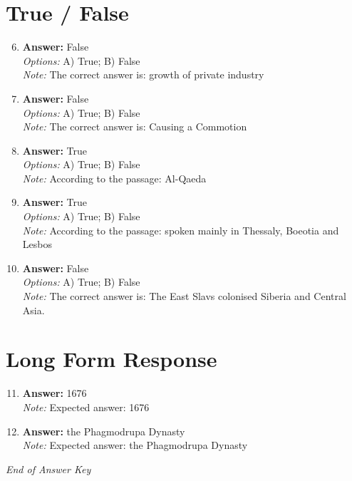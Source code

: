 \documentclass[12pt]{article}
\begin{document}
\section*{True / False}
\begin{enumerate}[label=\arabic*.]
\setcounter{enumi}{5}
\item \textbf{Answer:} False
\\ \textit{Options:} A) True; B) False
\\ \textit{Note:} The correct answer is: growth of private industry
\item \textbf{Answer:} False
\\ \textit{Options:} A) True; B) False
\\ \textit{Note:} The correct answer is: Causing a Commotion
\item \textbf{Answer:} True
\\ \textit{Options:} A) True; B) False
\\ \textit{Note:} According to the passage: Al-Qaeda
\item \textbf{Answer:} True
\\ \textit{Options:} A) True; B) False
\\ \textit{Note:} According to the passage: spoken mainly in Thessaly, Boeotia and Lesbos
\item \textbf{Answer:} False
\\ \textit{Options:} A) True; B) False
\\ \textit{Note:} The correct answer is: The East Slavs colonised Siberia and Central Asia.
\end{enumerate}

\section*{Long Form Response}
\begin{enumerate}[label=\arabic*.]
\setcounter{enumi}{10}
\item \textbf{Answer:} 1676
\\ \textit{Note:} Expected answer: 1676
\item \textbf{Answer:} the Phagmodrupa Dynasty
\\ \textit{Note:} Expected answer: the Phagmodrupa Dynasty
\end{enumerate}

\vfill
\noindent\textit{End of Answer Key}
\end{document}
